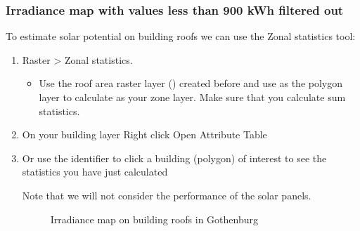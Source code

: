 \documentclass[letterpaper,10pt,english]{sphinxmanual}
\begin{document}
\subsubsection{Irradiance map with values less than 900 kWh filtered out}
\label{\detokenize{Tutorials/SEBE:irradiance-map-with-values-less-than-900-kwh-filtered-out}}
To estimate solar potential on building roofs we can use the Zonal
statistics tool:
\begin{enumerate}
\item {} 
Raster \textgreater{} Zonal statistics.
\begin{itemize}
\item {} 
Use the roof area raster layer ()
created before and use  as the polygon layer to
calculate as your zone layer. Make sure that you calculate sum
statistics.

\end{itemize}

\item {} 
On your building layer \textendash{} Right click Open Attribute Table

\item {} 
Or use the identifier to click a building (polygon) of interest to
see the statistics you have just calculated

Note that we will not consider the performance of the solar panels.

\begin{figure}[htbp]
\centering
\capstart

\noindent{}
\caption{Irradiance map on building roofs in Gothenburg}\label{\detokenize{Tutorials/SEBE:id8}}\end{figure}

\end{enumerate}
\end{document}
